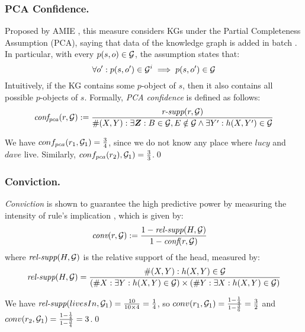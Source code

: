 \subsubsection{PCA Confidence.} Proposed by AMIE \cite{amie}, this measure considers KGs under the Partial Completeness Assumption (PCA), saying that data of the knowledge graph is added in batch \cite{amie}. In particular, with every $p(s,o) \in \mathcal{G}$, the assumption states that:
\[\forall o' : p(s,o') \in \mathcal{G}^i \implies p(s,o') \in \mathcal{G}\]
Intuitively, if the KG contains some $p$-object of $s$, then it also contains all possible $p$-objects of $s$. Formally, \textit{PCA confidence} is defined as follows:
\[
\mi{conf_{pca}}(r, \cG) := \frac{\textit{r-supp}(r, \cG)}{\#(X,Y): \exists \vec{Z}: B \in \cG, E \notin \cG  \wedge \exists Y': h(X,Y')\in \cG}
\]
\begin{example}
We have $conf_{pca}(r_1,\mathcal{G}_1) = \frac{3}{4}$, since we do not know any place where $lucy$ and $dave$ live. Similarly, $conf_{pca}(r_2),\mathcal{G}_1) = \frac{3}{3}$.\qed
\end{example}
\subsubsection{Conviction.} \textit{Conviction} is shown to guarantee the high predictive power \cite{Azevedo2007} by measuring the intensity of rule's implication \cite{metrics-summary}, which is given by:
\begin{align*}
\textit{conv}(r,\mathcal{G}) & := \frac{1 - \textit{rel-supp}(H, \mathcal{G})}{1-\textit{conf}(r,\mathcal{G})}
\end{align*}
where $\textit{rel-supp}(H, \mathcal{G})$ is the relative support of the head, measured by:
\begin{align*}
\textit{rel-supp}(H, \mathcal{G}) = \dfrac{\#(X,Y):h(X,Y)\in \mathcal{G}}{(\#X:\exists Y:h(X,Y)\in \mathcal{G})\times(\#Y:\exists X:h(X,Y)\in \mathcal{G})}
\end{align*}
\begin{example}
We have $\textit{rel-supp}(livesIn, \mathcal{G}_1) = \frac{10}{10 \times 4} = \frac{1}{4}$, so $conv(r_1,\mathcal{G}_1) = \frac{1-\frac{1}{4}}{1-\frac{3}{6}} = \frac{3}{2}$ and $conv(r_2,\mathcal{G}_1) = \frac{1-\frac{1}{4}}{1-\frac{3}{4}} = 3$.\qed
\end{example}
